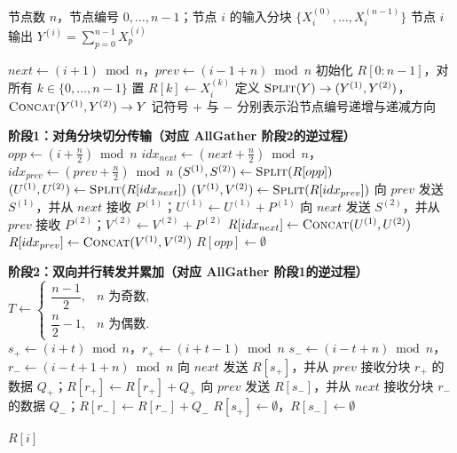 \begin{algorithm}[!htbp]
\caption{双半环 ReduceScatter（Double Half-Ring ReduceScatter）}
\label{alg:double_half_ring_reducescatter_sum}
\setlength{\baselineskip}{0.9\baselineskip}
\begin{algorithmic}[1]
\REQUIRE 节点数 $n$，节点编号 $0,\dots,n-1$；节点 $i$ 的输入分块 $\{X_i^{(0)},\dots,X_i^{(n-1)}\}$
\ENSURE 节点 $i$ 输出 $Y^{(i)}=\sum_{p=0}^{n-1}X_p^{(i)}$

\STATE $next \leftarrow (i+1)\bmod n$，$prev \leftarrow (i-1+n)\bmod n$
\STATE 初始化 $R[0:n-1]$，对所有 $k\in\{0,\dots,n-1\}$ 置 $R[k]\leftarrow X_i^{(k)}$
\STATE 定义 $\textsc{Split}(Y)\rightarrow (Y^{(1)},Y^{(2)})$，$\textsc{Concat}(Y^{(1)},Y^{(2)})\rightarrow Y$
\STATE 记符号 $+$ 与 $-$ 分别表示沿节点编号递增与递减方向

    \STATE \textbf{阶段1：对角分块切分传输（对应 AllGather 阶段2的逆过程）}
    \STATE $opp\leftarrow\left(i+\frac{n}{2}\right)\bmod n$
    \STATE $idx_{next}\leftarrow\left(next+\frac{n}{2}\right)\bmod n$，
           $idx_{prev}\leftarrow\left(prev+\frac{n}{2}\right)\bmod n$
    \STATE $(S^{(1)},S^{(2)})\leftarrow\textsc{Split}(R[opp])$
    \STATE $(U^{(1)},U^{(2)})\leftarrow\textsc{Split}(R[idx_{next}])$
    \STATE $(V^{(1)},V^{(2)})\leftarrow\textsc{Split}(R[idx_{prev}])$
    \STATE 向 $prev$ 发送 $S^{(1)}$，并从 $next$ 接收 $P^{(1)}$；$U^{(1)}\leftarrow U^{(1)}+P^{(1)}$
    \STATE 向 $next$ 发送 $S^{(2)}$，并从 $prev$ 接收 $P^{(2)}$；$V^{(2)}\leftarrow V^{(2)}+P^{(2)}$
    \STATE $R[idx_{next}]\leftarrow\textsc{Concat}(U^{(1)},U^{(2)})$
    \STATE $R[idx_{prev}]\leftarrow\textsc{Concat}(V^{(1)},V^{(2)})$
    \STATE $R[opp]\leftarrow\emptyset$
\ENDIF

\STATE \textbf{阶段2：双向并行转发并累加（对应 AllGather 阶段1的逆过程）}
\\[0.5em]
\STATE $T \leftarrow 
\begin{cases}
\dfrac{n-1}{2}, & n \text{ 为奇数},\\[0.2em]
\dfrac{n}{2}-1, & n \text{ 为偶数}.
\end{cases}$
\\[0.5em]
    \STATE $s_{+}\leftarrow(i+t)\bmod n$，$r_{+}\leftarrow(i+t-1)\bmod n$
    \STATE $s_{-}\leftarrow(i-t+n)\bmod n$，$r_{-}\leftarrow(i-t+1+n)\bmod n$
    \STATE 向 $next$ 发送 $R[s_{+}]$，并从 $prev$ 接收分块 $r_{+}$ 的数据 $Q_{+}$；$R[r_{+}]\leftarrow R[r_{+}]+Q_{+}$
    \STATE 向 $prev$ 发送 $R[s_{-}]$，并从 $next$ 接收分块 $r_{-}$ 的数据 $Q_{-}$；$R[r_{-}]\leftarrow R[r_{-}]+Q_{-}$
    \STATE $R[s_{+}]\leftarrow\emptyset$，$R[s_{-}]\leftarrow\emptyset$
\ENDFOR

\RETURN $R[i]$
\end{algorithmic}
\end{algorithm}

